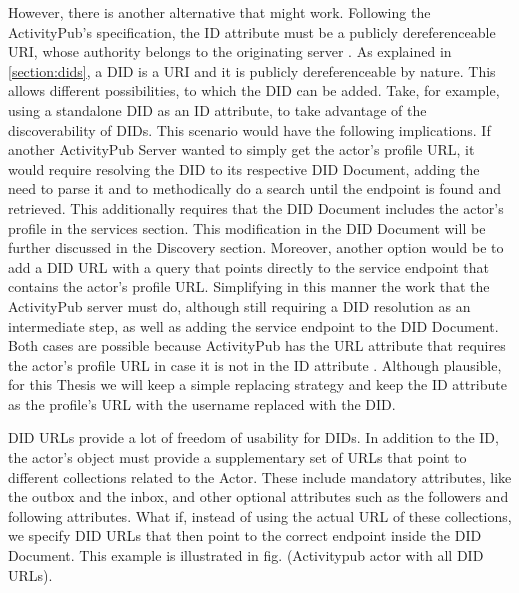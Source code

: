 However, there is another alternative that might work. Following the ActivityPub's specification, the ID attribute must be a publicly dereferenceable URI, whose authority belongs to the originating server \cite{lemmer-webber_tallon_guy_prodromou_2018}. As explained in \autoref{section:dids}, a DID is a URI and it is publicly dereferenceable by nature. This allows different possibilities, to which the DID can be added. Take, for example, using a stand\-alone DID as an ID attribute, to take advantage of the discoverability of DIDs. This scenario would have the following implications. If another ActivityPub Server wanted to simply get the actor's profile URL, it would require resolving the DID to its respective DID Document, adding the need to parse it and to methodically do a search until the endpoint is found and retrieved. This additionally requires that the DID Document includes the actor's profile in the services section. This modification in the DID Document will be further discussed in the Discovery section. Moreover, another option would be to add a DID URL with a query that points directly to the service endpoint that contains the actor's profile URL. Simplifying in this manner the work that the ActivityPub server must do, although still requiring a DID resolution as an intermediate step, as well as adding the service endpoint to the DID Document. Both cases are possible because ActivityPub has the URL attribute that requires the actor's profile URL in case it is not in the ID attribute \cite{lemmer-webber_tallon_guy_prodromou_2018}. Although plausible, for this Thesis we will keep a simple replacing strategy and keep the ID attribute as the profile's URL with the username replaced with the DID. 

DID URLs provide a lot of freedom of usability for DIDs. In addition to the ID, the actor's object must provide a supplementary set of URLs that point to different collections related to the Actor. These include mandatory attributes, like the outbox and the inbox, and other optional attributes such as the followers and following attributes. What if, instead of using the actual URL of these collections, we specify DID URLs that then point to the correct endpoint inside the DID Document. This example is illustrated in fig. (Activitypub actor with all DID URLs). 

